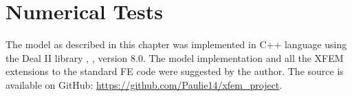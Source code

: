 \section{Numerical Tests}
\label{sec:pressure_results}

The model as described in this chapter was implemented in C++ language using the Deal II library \cite{bangerth_deal.ii_2007}, , version 8.0.
The model implementation and all the XFEM extensions to the standard FE code were suggested by the author.
The source is available on GitHub: \url{https://github.com/Paulie14/xfem_project}.

% 
% 



